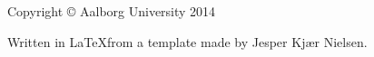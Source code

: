 \thispagestyle{empty}
{\small
\strut\vfill %
\noindent Copyright \copyright{} Aalborg University 2014\par
\vspace{0.2cm}
\noindent Written in \LaTeX  from a template made by Jesper Kjær Nielsen. 
}
\clearpage

